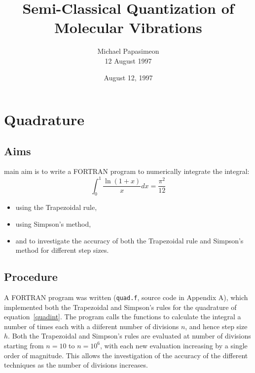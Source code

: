 \documentclass[a4paper]{IEEEtran}
\title{Semi-Classical Quantization of Molecular Vibrations}
\author{Michael Papasimeon\\ 12 August 1997} %
\date{August 12, 1997}
\begin{document}
\maketitle


\section{Quadrature}

\subsection{Aims}

      main aim is to write a FORTRAN program to numerically integrate 
      the integral:
      \begin{equation}
            \label{quadint}
            \int_{0}^{1} \frac{\ln(1+x)}{x} dx = \frac{\pi^{2}}{12}
      \end{equation}
      \begin{itemize}
            \item using the Trapezoidal rule,
            \item using Simpson's method,
            \item and to investigate the accuracy of both the
                  Trapezoidal rule and Simpson's method for different
                  step sizes.
      \end{itemize}

\subsection{Procedure}

    A FORTRAN program was written (\verb+quad.f+, source code in Appendix A),
    which implemented both the Trapezoidal and Simpson's rules for the 
    quadrature of equation~\ref{quadint}. The program calls the
    functions to calculate the integral a number of times each with a
    diiferent number of divisions $n$, and hence step size $h$. Both
    the Trapezoidal and Simpson's rules are evaluated at number of
    divisions 
    starting from $n=10$ to $n=10^6$, with each new evaluation
    increasing by a single order of magnitude. This allows the
    investigation of the accuracy of the different techniques as the
    number of divisions increases.
\end{document}
